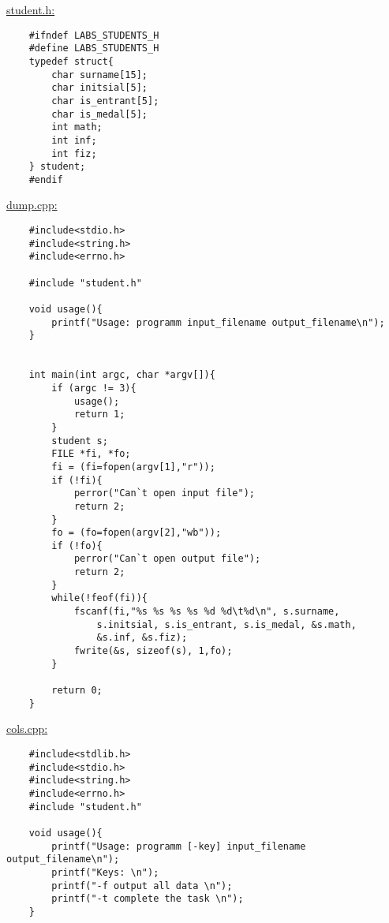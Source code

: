 
\begin{spacing}{1}

    \indent \large{\underline{student.h:}}
    \begin{verbatim}
    #ifndef LABS_STUDENTS_H
    #define LABS_STUDENTS_H
    typedef struct{
        char surname[15];
        char initsial[5];
        char is_entrant[5];
        char is_medal[5];
        int math;
        int inf;
        int fiz;
    } student;
    #endif
    \end{verbatim}

    \indent \large{\underline{dump.cpp:}}
    \begin{verbatim}
    #include<stdio.h>
    #include<string.h>
    #include<errno.h>

    #include "student.h"

    void usage(){
        printf("Usage: programm input_filename output_filename\n");
    }


    int main(int argc, char *argv[]){
        if (argc != 3){
            usage();
            return 1;
        }
        student s;
        FILE *fi, *fo;
        fi = (fi=fopen(argv[1],"r"));
        if (!fi){
            perror("Can`t open input file");
            return 2;
        }
        fo = (fo=fopen(argv[2],"wb"));
        if (!fo){
            perror("Can`t open output file");
            return 2;
        }
        while(!feof(fi)){
            fscanf(fi,"%s %s %s %s %d %d\t%d\n", s.surname, 
                s.initsial, s.is_entrant, s.is_medal, &s.math, 
                &s.inf, &s.fiz);
            fwrite(&s, sizeof(s), 1,fo);
        }
        
        return 0;
    }
    \end{verbatim}    

    \indent \large{\underline{cols.cpp:}}
    \begin{verbatim}
    #include<stdlib.h>
    #include<stdio.h>
    #include<string.h>
    #include<errno.h>
    #include "student.h"

    void usage(){
        printf("Usage: programm [-key] input_filename output_filename\n");
        printf("Keys: \n");
        printf("-f output all data \n");
        printf("-t complete the task \n");
    }


\end{verbatim}
\end{spacing}
